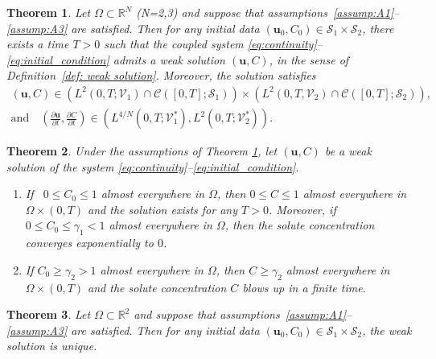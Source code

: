 \documentclass[final,3p,times]{elsarticle}
\theoremstyle{plain}
\newtheorem{theorem}{Theorem}[section]
\theoremstyle{remark}
\theoremstyle{plain}
\theoremstyle{remark}
\begin{document}
\begin{theorem}\label{th: existence}
Let $\Omega \subset \mathds R^N$ (N=2,3) and suppose that assumptions~\eqref{assump:A1}--\eqref{assump:A3} are satisfied. Then for any initial data \((\mathbf{u}_0, C_0) \in\mathscr S_1 \times  \mathscr S_2\), there exists a time $T>0$ such that the coupled system \eqref{eq:continuity}--\eqref{eq:initial_condition} admits a weak solution \((\mathbf{u}, C)\), in the sense of Definition~\ref{def: weak solution}. Moreover, the solution satisfies 
\begin{align*}
    (\mathbf u, C)\in \left(L^2(0,T;\mathscr V_1)\cap \mathcal C([0,T]; \mathscr S_1)\right)\times\left(L^2(0,T,\mathscr V_2)\cap \mathcal C([0,T]; \mathscr S_2)\right), \\ 
    \text{and} \quad\left(\frac{\partial \mathbf u}{\partial t},\frac{\partial C}{\partial t}\right) \in\left(L^{4/N}\left(0,T;\mathscr V_1^*\right),L^{2}\left(0,T;\mathscr V_2^*\right)\right).
\end{align*}
\end{theorem}
\begin{theorem} \label{th: bddness & blow_up}
    Under the assumptions of Theorem \ref{th: existence}, let $(\mathbf u, C)$ be a weak solution of the system \eqref{eq:continuity}--\eqref{eq:initial_condition}.
    \begin{enumerate}
        \item If \ $0\leq C_0\leq 1$ almost everywhere in $\Omega$, then $0\leq C \leq 1$ almost everywhere in $\Omega \times (0,T)$ and the solution exists for any $T>0$. Moreover, if $0\leq C_0\leq \gamma_1<1$ almost everywhere in $\Omega$, then the solute concentration converges exponentially to $0$.
        \item If $C_0\geq \gamma_2>1$ almost everywhere in $\Omega$, then $ C \geq \gamma_2$ almost everywhere in $\Omega \times (0,T)$ and the solute concentration $C$ blows up in a finite time.
    \end{enumerate}
\end{theorem}
\begin{theorem} \label{th: Uniqueness}
 Let $\Omega \subset \mathds R^2$ and suppose that assumptions~\eqref{assump:A1}--\eqref{assump:A3} are satisfied. Then for any initial data \((\mathbf{u}_0, C_0) \in\mathscr S_1 \times  \mathscr S_2\), the weak solution is unique.
\end{theorem}
\end{document}
